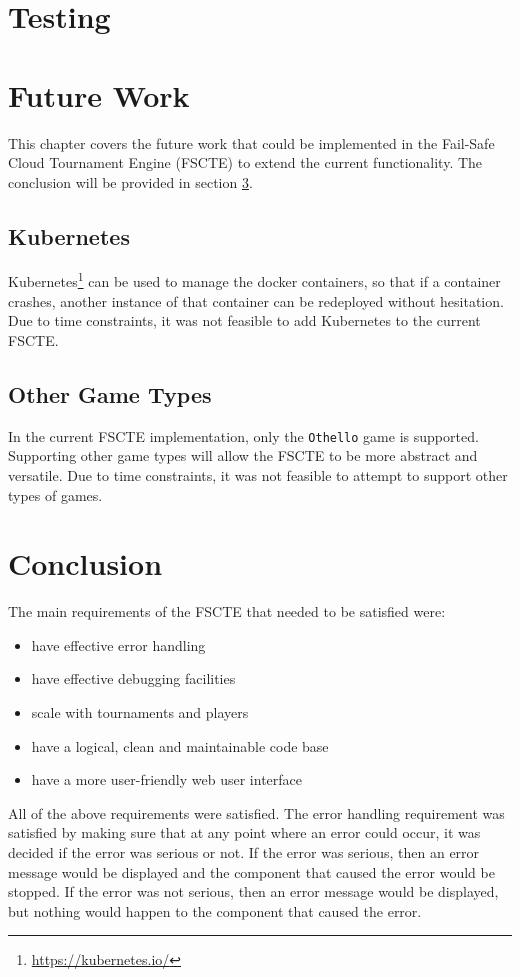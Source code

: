 \documentclass[a4paper, 12pt]{report}
\begin{document}
\chapter{Testing}
\label{chap:testing}

\chapter{Future Work}
\label{chap:future}

This chapter covers the future work that could be implemented in the Fail-Safe
Cloud Tournament Engine (FSCTE) to extend the current functionality. The
conclusion will be provided in section \ref{chap:conclusion}.

\section{Kubernetes}

Kubernetes\footnote{\url{https://kubernetes.io/}} can be used to manage the docker
containers, so that if a container crashes, another instance of that container
can be redeployed without hesitation. Due to time constraints, it was not feasible
to add Kubernetes to the current FSCTE.

\section{Other Game Types}

In the current FSCTE implementation, only the \texttt{Othello} game is supported.
Supporting other game types will allow the FSCTE to be more abstract and versatile.
Due to time constraints, it was not feasible to attempt to support other types
of games.

\chapter{Conclusion}
\label{chap:conclusion}

The main requirements of the FSCTE that needed to be satisfied were:
\begin{itemize}
	\item have effective error handling
	\item have effective debugging facilities
	\item scale with tournaments and players
	\item have a logical, clean and maintainable code base
	\item have a more user-friendly web user interface
\end{itemize}
All of the above requirements were satisfied. The error handling requirement
was satisfied by making sure that at any point where an error could occur, it
was decided if the error was serious or not. If the error was serious, then an
error message would be displayed and the component that caused the error would
be stopped. If the error was not serious, then an error message would be displayed,
but nothing would happen to the component that caused the error. \\
\end{document}
